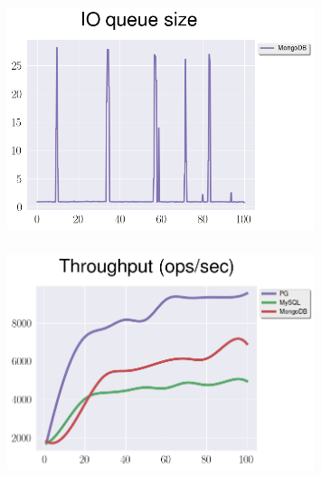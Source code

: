 \documentclass[usenames,dvipsnames, 18pt, compress, aspectratio=169]{beamer}
\begin{document}
\begin{frame}
    \frametitle{}
    \begin{center}
    \vspace{10pt}
    \begin{figure}
        \includegraphics[width=0.8\textwidth,center]{benchmarks/mongodb_update_io_queue_size.png}
    \end{figure}
    \end{center}
\end{frame}


\begin{frame}
    \frametitle{}
    \begin{center}
    \vspace{10pt}
    \begin{figure}
        \includegraphics[width=0.8\textwidth,center]{benchmarks/insert_throughput_wal_size.png}
    \end{figure}
    \end{center}
\end{frame}
\end{document}
